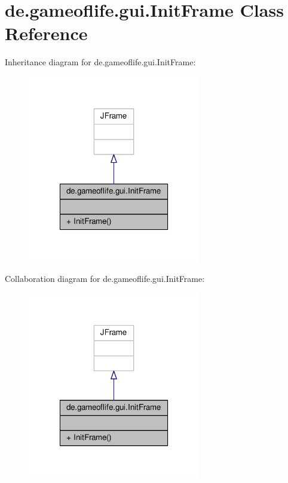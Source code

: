 \hypertarget{classde_1_1gameoflife_1_1gui_1_1InitFrame}{\section{de.\-gameoflife.\-gui.\-Init\-Frame Class Reference}
\label{classde_1_1gameoflife_1_1gui_1_1InitFrame}
}


Inheritance diagram for de.\-gameoflife.\-gui.\-Init\-Frame\-:\nopagebreak
\begin{figure}[H]
\begin{center}
\leavevmode
\includegraphics[width=214pt]{classde_1_1gameoflife_1_1gui_1_1InitFrame__inherit__graph}
\end{center}
\end{figure}


Collaboration diagram for de.\-gameoflife.\-gui.\-Init\-Frame\-:\nopagebreak
\begin{figure}[H]
\begin{center}
\leavevmode
\includegraphics[width=214pt]{classde_1_1gameoflife_1_1gui_1_1InitFrame__coll__graph}
\end{center}
\end{figure}
